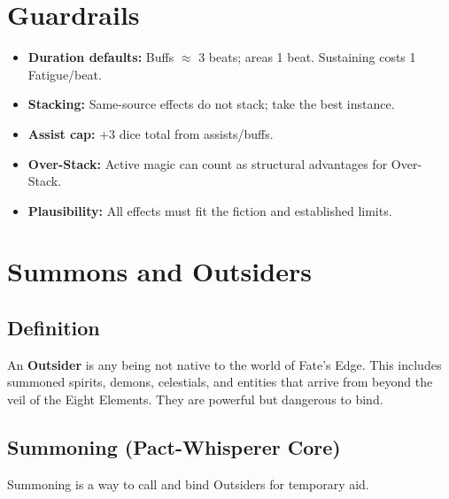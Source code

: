 \section{Guardrails}
\label{sec:magic-guardrails}

\begin{itemize}
\item \textbf{Duration defaults:} Buffs $\approx$ 3 beats; areas 1 beat. Sustaining costs 1 Fatigue/beat.
\item \textbf{Stacking:} Same-source effects do not stack; take the best instance.
\item \textbf{Assist cap:} +3 dice total from assists/buffs.
\item \textbf{Over-Stack:} Active magic can count as structural advantages for Over-Stack.
\item \textbf{Plausibility:} All effects must fit the fiction and established limits.
\end{itemize}




\floatbarrier
\clearpage

\section{Summons and Outsiders}

\subsection{Definition}
An \textbf{Outsider} is any being not native to the world of Fate’s Edge. This includes summoned spirits, demons, celestials, and entities that arrive from beyond the veil of the Eight Elements. They are powerful but dangerous to bind.

\subsection{Summoning (Pact-Whisperer Core)}
Summoning is a way to call and bind Outsiders for temporary aid.

